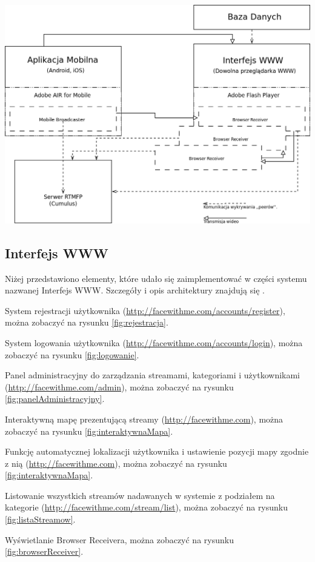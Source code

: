 \begin{center}
    \includegraphics[width=\textwidth]{diagramy/architetura-implementacja.png}
    \label{fig:architekturaImplementacji}
\end{center}

\subsection{Interfejs WWW}
Niżej przedstawiono elementy, które udało się zaimplementować w części systemu nazwanej Interfejs WWW. Szczegóły i opis architektury znajdują się .

\begin{packed_item}
    \item{System rejestracji użytkownika (\url{http://facewithme.com/accounts/register}), można zobaczyć na rysunku \ref{fig:rejestracja}.}
    \item{System logowania użytkownika (\url{http://facewithme.com/accounts/login}), można zobaczyć na rysunku \ref{fig:logowanie}.}
    \item{Panel administracyjny do zarządzania streamami, kategoriami i użytkownikami (\url{http://facewithme.com/admin}), można zobaczyć na rysunku \ref{fig:panelAdministracyjny}.}
    \item{Interaktywną mapę prezentującą streamy (\url{http://facewithme.com}), można zobaczyć na rysunku \ref{fig:interaktywnaMapa}.}
    \item{Funkcję automatycznej lokalizacji użytkownika i ustawienie pozycji mapy zgodnie z nią (\url{http://facewithme.com}), można zobaczyć na rysunku \ref{fig:interaktywnaMapa}.}
    \item{Listowanie wszystkich streamów nadawanych w systemie z podziałem na kategorie (\url{http://facewithme.com/stream/list}), można zobaczyć na rysunku \ref{fig:listaStreamow}.}
    \item{Wyświetlanie Browser Receivera, można zobaczyć na rysunku \ref{fig:browserReceiver}.}
\end{packed_item}

